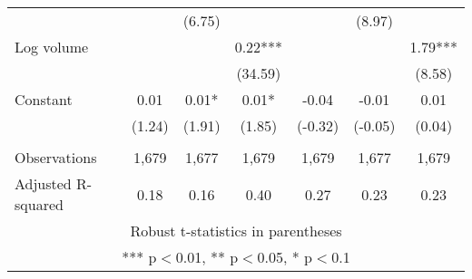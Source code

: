 \documentclass[]{article}
\begin{document}
\begin{tabular}{lcccccc}
 &  & (6.75) &  &  & (8.97) &  \\
Log volume &  &  & 0.22*** &  &  & 1.79*** \\
 &  &  & (34.59) &  &  & (8.58) \\
Constant & 0.01 & 0.01* & 0.01* & -0.04 & -0.01 & 0.01 \\
 & (1.24) & (1.91) & (1.85) & (-0.32) & (-0.05) & (0.04) \\
 &  &  &  &  &  &  \\
Observations & 1,679 & 1,677 & 1,679 & 1,679 & 1,677 & 1,679 \\
 Adjusted R-squared & 0.18 & 0.16 & 0.40 & 0.27 & 0.23 & 0.23 \\ \hline
\multicolumn{7}{c}{ Robust t-statistics in parentheses} \\
\multicolumn{7}{c}{ *** p$<$0.01, ** p$<$0.05, * p$<$0.1} \\
\end{tabular}
\end{document}
